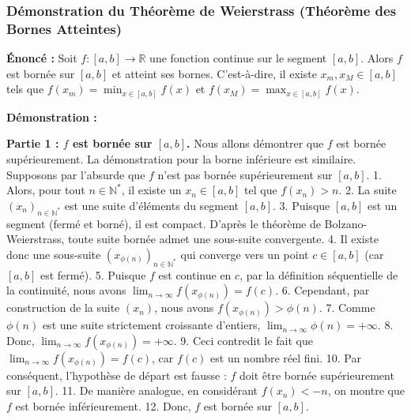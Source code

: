 \documentclass[12pt,a4paper]{report}
\begin{document}
\subsubsection{Démonstration du Théorème de Weierstrass (Théorème des Bornes Atteintes)}
\textbf{Énoncé :} Soit $f : [a, b] \to \mathbb{R}$ une fonction continue sur le segment $[a, b]$. Alors $f$ est bornée sur $[a, b]$ et atteint ses bornes. C'est-à-dire, il existe $x_m, x_M \in [a, b]$ tels que $f(x_m) = \min_{x \in [a,b]} f(x)$ et $f(x_M) = \max_{x \in [a,b]} f(x)$.

\textbf{Démonstration :}

\textbf{Partie 1 : $f$ est bornée sur $[a, b]$.}
Nous allons démontrer que $f$ est bornée supérieurement. La démonstration pour la borne inférieure est similaire.
Supposons par l'absurde que $f$ n'est pas bornée supérieurement sur $[a, b]$.
1.  Alors, pour tout $n \in \mathbb{N}^*$, il existe un $x_n \in [a, b]$ tel que $f(x_n) > n$.
2.  La suite $(x_n)_{n \in \mathbb{N}^*}$ est une suite d'éléments du segment $[a, b]$.
3.  Puisque $[a, b]$ est un segment (fermé et borné), il est compact. D'après le théorème de Bolzano-Weierstrass, toute suite bornée admet une sous-suite convergente.
4.  Il existe donc une sous-suite $(x_{\phi(n)})_{n \in \mathbb{N}^*}$ qui converge vers un point $c \in [a, b]$ (car $[a, b]$ est fermé).
5.  Puisque $f$ est continue en $c$, par la définition séquentielle de la continuité, nous avons $\lim_{n \to \infty} f(x_{\phi(n)}) = f(c)$.
6.  Cependant, par construction de la suite $(x_n)$, nous avons $f(x_{\phi(n)}) > \phi(n)$.
7.  Comme $\phi(n)$ est une suite strictement croissante d'entiers, $\lim_{n \to \infty} \phi(n) = +\infty$.
8.  Donc, $\lim_{n \to \infty} f(x_{\phi(n)}) = +\infty$.
9.  Ceci contredit le fait que $\lim_{n \to \infty} f(x_{\phi(n)}) = f(c)$, car $f(c)$ est un nombre réel fini.
10. Par conséquent, l'hypothèse de départ est fausse : $f$ doit être bornée supérieurement sur $[a, b]$.
11. De manière analogue, en considérant $f(x_n) < -n$, on montre que $f$ est bornée inférieurement.
12. Donc, $f$ est bornée sur $[a, b]$.
\end{document}
